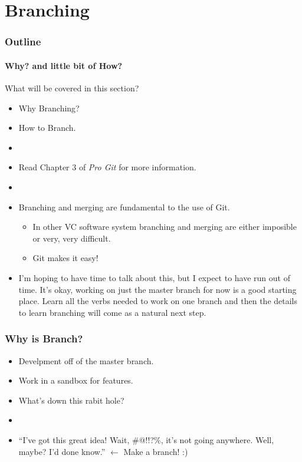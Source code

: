 \section{Branching}

\begin{frame}[t]
  \frametitle{Outline}
  \framesubtitle{Why? and little bit of How?}
\end{frame}

\begin{frame}[t]{What will be covered in this section?}
  \begin{itemize}
    \item Why Branching?
    \item How to Branch.
    \item[]
    \item Read Chapter 3 of {\it Pro Git} for more information.
    \item[]
    \item Branching and merging are fundamental to the use of Git.  
      \begin{itemize}
        \item In other VC software system branching and merging are either
          imposible or very, very difficult.
        \item Git makes it easy!
      \end{itemize}

    \item I'm hoping to have time to talk about this, but I expect to have run
      out of time.  It's okay, working on just the master branch for now is a
      good starting place.  Learn all the verbs needed to work on one branch and
      then the details to learn branching will come as a natural next step.
  \end{itemize}
\end{frame}

\begin{frame}[t]
  \frametitle{Why is Branch?}
  \begin{itemize}
    \item Develpment off of the master branch.
    \item Work in a sandbox for features.
    \item What's down this rabit hole?
    \item[]
    \item ``I've got this great idea!  Wait, \#$@$!!?\%, it's not going
      anywhere.  Well, maybe?  I'd done know.'' $\leftarrow$ Make a branch! :)
  \end{itemize}
\end{frame}

